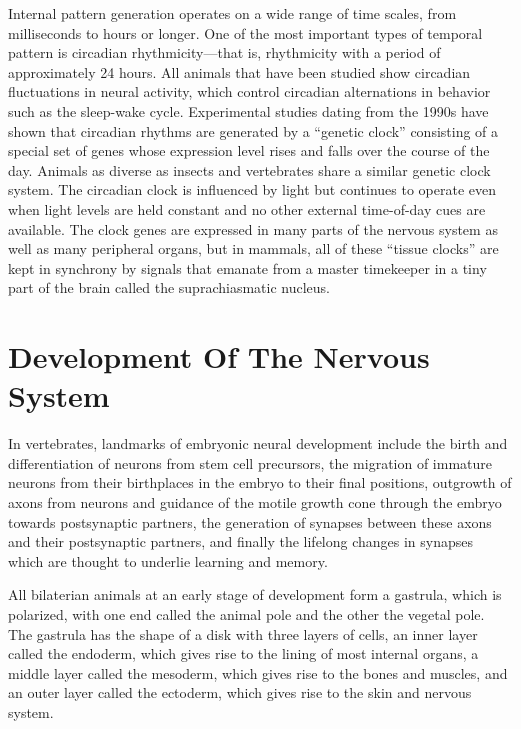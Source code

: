 Internal pattern generation operates on a wide range of time scales, from milliseconds to hours or longer. One of the most important types of temporal pattern is circadian rhythmicity---that is, rhythmicity with a period of approximately 24 hours. All animals that have been studied show circadian fluctuations in neural activity, which control circadian alternations in behavior such as the sleep-wake cycle. Experimental studies dating from the 1990s have shown that circadian rhythms are generated by a ``genetic clock'' consisting of a special set of genes whose expression level rises and falls over the course of the day. Animals as diverse as insects and vertebrates share a similar genetic clock system. The circadian clock is influenced by light but continues to operate even when light levels are held constant and no other external time-of-day cues are available. The clock genes are expressed in many parts of the nervous system as well as many peripheral organs, but in mammals, all of these ``tissue clocks'' are kept in synchrony by signals that emanate from a master timekeeper in a tiny part of the brain called the suprachiasmatic nucleus.

\hypertarget{development-of-the-nervous-system}{%
\section{Development Of The Nervous System}\label{development-of-the-nervous-system}}

In vertebrates, landmarks of embryonic neural development include the birth and differentiation of neurons from stem cell precursors, the migration of immature neurons from their birthplaces in the embryo to their final positions, outgrowth of axons from neurons and guidance of the motile growth cone through the embryo towards postsynaptic partners, the generation of synapses between these axons and their postsynaptic partners, and finally the lifelong changes in synapses which are thought to underlie learning and memory.

All bilaterian animals at an early stage of development form a gastrula, which is polarized, with one end called the animal pole and the other the vegetal pole. The gastrula has the shape of a disk with three layers of cells, an inner layer called the endoderm, which gives rise to the lining of most internal organs, a middle layer called the mesoderm, which gives rise to the bones and muscles, and an outer layer called the ectoderm, which gives rise to the skin and nervous system.

